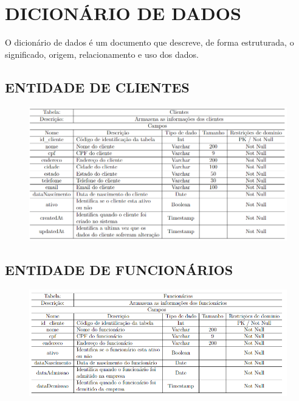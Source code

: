 \newpage
\section{DICIONÁRIO DE DADOS}
O dicionário de dados é um documento que descreve, de forma estruturada, o significado, origem, relacionamento e uso dos dados.
\subsection{ENTIDADE DE CLIENTES}
\begin{figure}[htb]
	\begin{center}
	    \includegraphics[width=1\linewidth]{imagens/dc1.png}
	\end{center}
\end{figure}

\subsection{ENTIDADE DE FUNCIONÁRIOS}
\begin{figure}[htb]
	\begin{center}
	    \includegraphics[width=1\linewidth]{imagens/dc2.png}
	\end{center}
\end{figure}

\newpage

